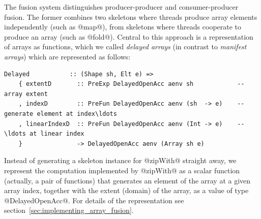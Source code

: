 The fusion system distinguishes producer-producer and consumer-producer fusion.
The former combines two skeletons where threads produce array elements
independently (such as @map@), from skeletons where threads cooperate to
produce an array (such as @fold@). Central to this approach is a
representation of arrays as functions, which we called \emph{delayed
arrays} (in contrast to \emph{manifest
arrays}) which are represented as follows:
%
\begin{lstlisting}[style=haskell]
  Delayed           :: (Shape sh, Elt e) =>
    { extentD       :: PreExp DelayedOpenAcc aenv sh            -- array extent
    , indexD        :: PreFun DelayedOpenAcc aenv (sh  -> e)    -- generate element at index\ldots
    , linearIndexD  :: PreFun DelayedOpenAcc aenv (Int -> e)    -- \ldots at linear index
    }               -> DelayedOpenAcc aenv (Array sh e)
\end{lstlisting}
%
Instead of generating a skeleton instance for @zipWith@ straight away, we
represent the computation implemented by @zipWith@ as a scalar function
(actually, a pair of functions) that generates an element of the array at a
given array index, together with the extent (domain) of the array, as a value of
type @DelayedOpenAcc@. For details of the representation see
section~\ref{sec:implementing_array_fusion}.

